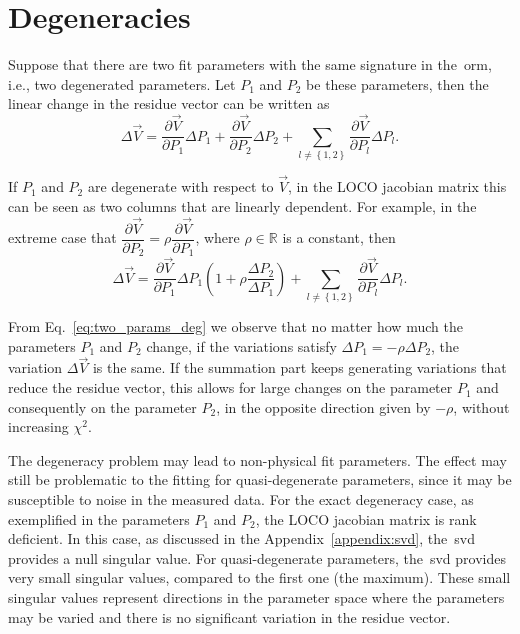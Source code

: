 \section{Degeneracies}\label{sec:degeneracy}
Suppose that there are two fit parameters with the same signature in the~\gls{orm}, i.e., two degenerated parameters. Let $P_1$ and $P_2$ be these parameters, then the linear change in the residue vector can be written as
\begin{equation}
\Delta \vec{V} = \dfrac{\partial \vec{V}}{\partial P_{1}} \Delta P_{1} + \dfrac{\partial \vec{V}}{\partial P_{2}} \Delta P_{2} + \sum_{l \neq \left\{1,2\right\}}\dfrac{\partial \vec{V}}{\partial P_{l}} \Delta P_{l}.
\end{equation}

If $P_1$ and $P_2$ are degenerate with respect to $\vec{V}$, in the LOCO jacobian matrix this can be seen as two columns that are linearly dependent. For example, in the extreme case that $\dfrac{\partial \vec{V}}{\partial P_{2}} = \rho \dfrac{\partial \vec{V}}{\partial P_{1}}$, where $\rho \in \mathbb{R}$ is a constant, then 
\begin{equation}
\Delta \vec{V} = \dfrac{\partial \vec{V}}{\partial P_{1}} \Delta P_{1}\left(1 + \rho \dfrac{\Delta P_2}{\Delta P_1}\right) + \sum_{l \neq \left\{1,2\right\}}\dfrac{\partial \vec{V}}{\partial P_{l}} \Delta P_{l}.
\label{eq:two_params_deg}
\end{equation}

From Eq.~\eqref{eq:two_params_deg} we observe that no matter how much the parameters $P_1$ and $P_2$ change, if the variations satisfy $\Delta P_1 = - \rho \Delta P_2$, the variation $\Delta \vec{V}$ is the same. If the summation part keeps generating variations that reduce the residue vector, this allows for large changes on the parameter $P_1$ and consequently on the parameter $P_2$, in the opposite direction given by $-\rho$, without increasing $\chi^2$.

The degeneracy problem may lead to non-physical fit parameters. The effect may still be problematic to the fitting for quasi-degenerate parameters, since it may be susceptible to noise in the measured data. For the exact degeneracy case, as exemplified in the parameters $P_1$ and $P_2$, the LOCO jacobian matrix is rank deficient. In this case, as discussed in the Appendix~\ref{appendix:svd}, the~\gls{svd} provides a null singular value. For quasi-degenerate parameters, the~\gls{svd} provides very small singular values, compared to the first one (the maximum). These small singular values represent directions in the parameter space where the parameters may be varied and there is no significant variation in the residue vector. 

